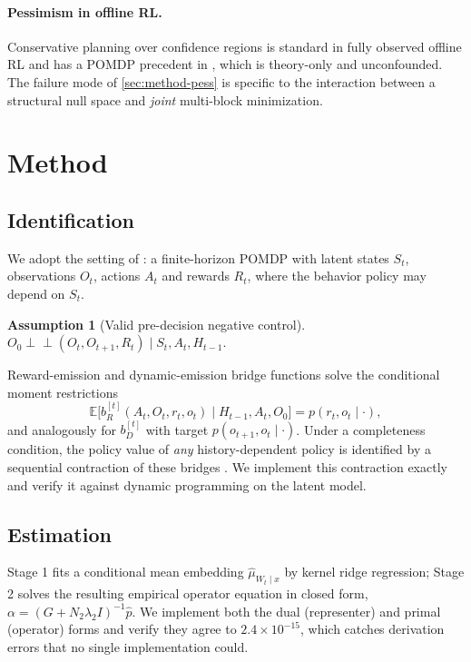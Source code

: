 \documentclass{article}
\theoremstyle{plain}
\theoremstyle{definition}
\newtheorem{assumption}[theorem]{Assumption}
\begin{document}
\paragraph{Pessimism in offline RL.} Conservative planning over confidence
regions is standard in fully observed offline RL and has a POMDP precedent in
\citet{guo2022}, which is theory-only and unconfounded. The failure mode of
\cref{sec:method-pess} is specific to the interaction between a structural null
space and \emph{joint} multi-block minimization.

\section{Method}
\label{sec:method}

\subsection{Identification}
We adopt the setting of \citet{hong2024}: a finite-horizon POMDP with latent
states $S_t$, observations $O_t$, actions $A_t$ and rewards $R_t$, where the
behavior policy may depend on $S_t$. \begin{assumption}[Valid pre-decision negative control]
\label{as:nc}
$O_0 \perp\!\!\!\perp (O_t, O_{t+1}, R_t) \mid S_t, A_t, H_{t-1}$.
\end{assumption}
Reward-emission and dynamic-emission bridge functions solve the conditional
moment restrictions
\begin{equation}
\mathbb{E}\bigl[b^{[t]}_{R}(A_t, O_t, r_t, o_t) \mid H_{t-1}, A_t, O_0\bigr]
= p(r_t, o_t \mid \cdot),
\label{eq:mr}
\end{equation}
and analogously for $b^{[t]}_{D}$ with target $p(o_{t+1}, o_t \mid \cdot)$. Under
a completeness condition, the policy value of \emph{any} history-dependent policy
is identified by a sequential contraction of these bridges
\citep[Thm.~3.5]{hong2024}. We implement this contraction exactly and verify it
against dynamic programming on the latent model.

\subsection{Estimation}
Stage 1 fits a conditional mean embedding $\hat\mu_{W_t \mid x}$ by kernel ridge
regression; Stage 2 solves the resulting empirical operator equation in closed
form, $\alpha = (G + N_2\lambda_2 I)^{-1}\hat p$. We implement both the dual
(representer) and primal (operator) forms and verify they agree to
$2.4\times10^{-15}$, which catches derivation errors that no single
implementation could.
\end{document}
